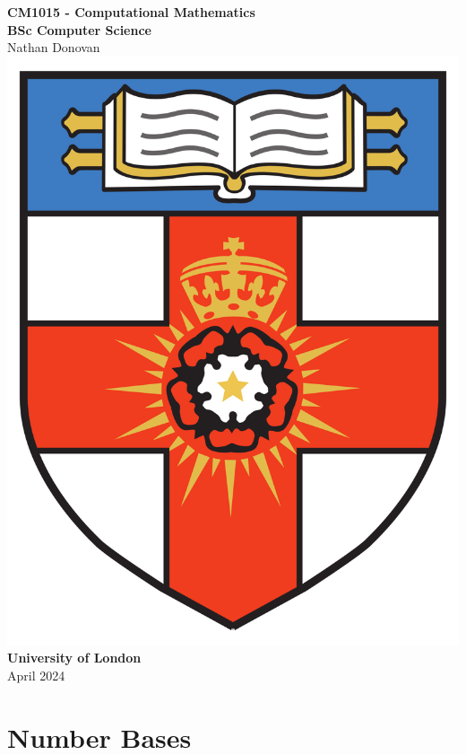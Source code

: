 \documentclass{article}
\begin{document}
\begin{titlepage}
    \centering
    \vspace*{2cm}
    
    {\LARGE\bfseries CM1015 - Computational Mathematics}\\[0.8cm]
    {\large\bfseries BSc Computer Science}\\[0.5cm] 
    {\large\textnormal{Nathan Donovan}}\\[1.5cm] 

    \includegraphics[scale=0.1]{../images/university-of-london-logo.png}\\[1.5cm] 
    {\Large\bfseries University of London}\\[1cm]
    {\large April 2024}

    \vfill
    
\end{titlepage}

\newpage
\section*{Number Bases}
\end{document}
